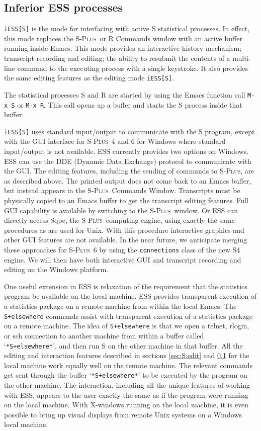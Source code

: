 \documentclass{article}
\newcommand*{\Splus}{\textsc{S-Plus}}
\newcommand{\stexttt}[1]{{\small\texttt{#1}}}
\newcommand{\file}[1]{`\stexttt{#1}'}
\begin{document}
\subsection{Inferior ESS processes}
\label{sec:S:inf}

\stexttt{iESS[S]} is the mode for interfacing with active S
statistical processes.  In effect, this mode replaces the \Splus\ or R
Commands window with an active buffer running inside Emacs.  This mode
provides an interactive history mechanism; transcript recording and
editing; the ability to resubmit the contents of a multi-line command
to the executing process with a single keystroke.  It also provides
the same editing features as the editing mode \stexttt{iESS[S]}.

The statistical processes S and R are started by using the Emacs
function call \stexttt{M-x~S} or \stexttt{M-x~R}.  This call opens up
a buffer and starts the S process inside that buffer.

\stexttt{iESS[S]} uses standard input/output to communicate with the S
program, except with the GUI interface for \Splus\ 4 and 6 for Windows
where standard input/output is not available.  ESS currently provides
two options on Windows.  ESS can use the DDE (Dynamic Data Exchange)
protocol to communicate with the GUI.  The editing features, including
the sending of commands to \Splus, are as described above.  The
printed output does not come back to an Emacs buffer, but instead
appears in the \Splus\ Commands Window.  Transcripts must be
physically copied to an Emacs buffer to get the transcript editing
features.  Full GUI capability is available by switching to the
\Splus\ window.  Or ESS can directly access Sqpe, the \Splus\ 
computing engine, using exactly the same procedures as are used for
Unix.  With this procedure interactive graphics and other GUI features
are not available.  In the near future, we anticipate merging these
approaches for \Splus\ 6 by using the \stexttt{connections} class of
the new S4 engine.  We will then have both interactive GUI and
transcript recording and editing on the Windows platform.

One useful extension in ESS is relaxation of the requirement that the
statistics program be available on the local machine.  ESS provides
transparent execution of a statistics package on a remote machine from
within the local Emacs.  The \stexttt{S+elsewhere} commands assist
with transparent execution of a statistics package on a remote
machine.  The idea of \stexttt{S+elsewhere} is that we open a telnet,
rlogin, or ssh connection to another machine from within a buffer
called \file{*S+elsewhere*}, and then run S on the other machine in
that buffer.  All the editing and interaction features described in
sections \ref{sec:S:edit} and \ref{sec:S:inf} for the local machine
work equally well on the remote machine.  The relevant commands get
sent through the buffer \file{*S+elsewhere*} to be executed by the
program on the other machine.  The interaction, including all the
unique features of working with ESS, appears to the user exactly the
same as if the program were running on the local machine.  With
X-windows running on the local machine, it is even possible to bring
up visual displays from remote Unix systems on a Windows local
machine.
\end{document}
